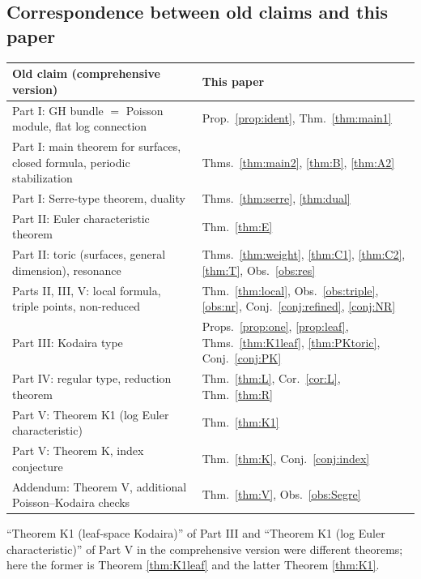 \subsection{Correspondence between old claims and this paper}
\begin{center}\small
\begin{tabular}{>{\raggedright\arraybackslash}p{5.4cm}>{\raggedright\arraybackslash}p{9.2cm}}\toprule
Old claim (comprehensive version) & This paper \\\midrule
Part I: GH bundle $=$ Poisson module, flat log connection & Prop.\ \ref{prop:ident}, Thm.\ \ref{thm:main1}\\
Part I: main theorem for surfaces, closed formula, periodic stabilization & Thms.\ \ref{thm:main2}, \ref{thm:B}, \ref{thm:A2}\\
Part I: Serre-type theorem, duality & Thms.\ \ref{thm:serre}, \ref{thm:dual}\\
Part II: Euler characteristic theorem & Thm.\ \ref{thm:E}\\
Part II: toric (surfaces, general dimension), resonance & Thms.\ \ref{thm:weight}, \ref{thm:C1}, \ref{thm:C2}, \ref{thm:T}, Obs.\ \ref{obs:res}\\
Parts II, III, V: local formula, triple points, non-reduced & Thm.\ \ref{thm:local}, Obs.\ \ref{obs:triple}, \ref{obs:nr}, Conj.\ \ref{conj:refined}, \ref{conj:NR}\\
Part III: Kodaira type & Props.\ \ref{prop:one}, \ref{prop:leaf}, Thms.\ \ref{thm:K1leaf}, \ref{thm:PKtoric}, Conj.\ \ref{conj:PK}\\
Part IV: regular type, reduction theorem & Thm.\ \ref{thm:L}, Cor.\ \ref{cor:L}, Thm.\ \ref{thm:R}\\
Part V: Theorem K1 (log Euler characteristic) & Thm.\ \ref{thm:K1}\\
Part V: Theorem K, index conjecture & Thm.\ \ref{thm:K}, Conj.\ \ref{conj:index}\\
Addendum: Theorem V, additional Poisson--Kodaira checks & Thm.\ \ref{thm:V}, Obs.\ \ref{obs:Segre}\\\bottomrule
\end{tabular}
\end{center}
``Theorem K1 (leaf-space Kodaira)'' of Part III and ``Theorem K1 (log Euler characteristic)'' of Part V in the comprehensive version were different theorems; here the former is Theorem \ref{thm:K1leaf} and the latter Theorem \ref{thm:K1}.

